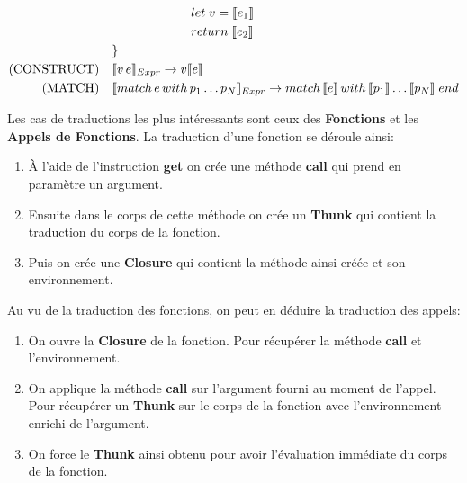 \documentclass[12pt]{article}
\begin{document}
\begin{align*}
                               & \quad \quad \quad \quad \quad \quad \; let \; v = \llbracket e_1 \rrbracket                                                                                                                                          \\
                               & \quad \quad \quad \quad \quad \quad \; return \;\llbracket e_2 \rrbracket                                                                                                                                            \\
                               & \}                                                                                                                                                                             \\
      \text{(CONSTRUCT)} \quad & \llbracket v \, e \rrbracket_{Expr} \rightarrow v\llbracket e \rrbracket                                                                                                                  \\
      \text{(MATCH)} \quad     & \llbracket match \, e \, with \, p_1 \dots p_N  \rrbracket_{Expr}\rightarrow  match \, \llbracket e \rrbracket \, with \, \llbracket p_1 \rrbracket \dots \llbracket p_N \rrbracket \; end        \\
\end{align*}

Les cas de traductions les plus intéressants sont ceux des \textbf{Fonctions} et les \textbf{Appels de Fonctions}.
La traduction d'une fonction se déroule ainsi:
\begin{enumerate}
      \tightlist
      \item
            À l'aide de l'instruction \textbf{get} on crée une méthode \textbf{call} qui prend en paramètre un argument.
      \item
            Ensuite dans le corps de cette méthode on crée un \textbf{Thunk} qui contient la traduction du corps de la fonction.
      \item
            Puis on crée une \textbf{Closure} qui contient la méthode ainsi créée et son environnement.
\end{enumerate}
Au vu de la traduction des fonctions, on peut en déduire la traduction des appels:
\begin{enumerate}
      \tightlist
      \item
            On ouvre la \textbf{Closure} de la fonction.
            Pour récupérer la méthode \textbf{call} et l'environnement.
      \item
            On applique la méthode \textbf{call} sur l'argument fourni au moment de l'appel.
            Pour récupérer un \textbf{Thunk} sur le corps de la fonction  avec l'environnement enrichi de l'argument.
      \item
            On force le \textbf{Thunk} ainsi obtenu pour avoir l'évaluation immédiate du corps de la fonction.
\end{enumerate}
\end{document}
